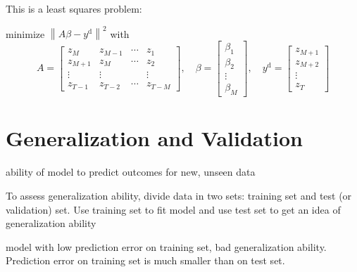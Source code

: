 \begin{problem}
    This is a least squares problem: 
    
    minimize $ \left\|A \beta-y^{\mathrm{d}}\right\|^{2} $ with
\begin{equation}
A=\left[\begin{array}{cccc}
z_{M} & z_{M-1} & \cdots & z_{1} \\
z_{M+1} & z_{M} & \cdots & z_{2} \\
\vdots & \vdots & & \vdots \\
z_{T-1} & z_{T-2} & \cdots & z_{T-M}
\end{array}\right], \quad \beta=\left[\begin{array}{c}
\beta_{1} \\
\beta_{2} \\
\vdots \\
\beta_{M}
\end{array}\right], \quad y^{\mathrm{d}}=\left[\begin{array}{c}
z_{M+1} \\
z_{M+2} \\
\vdots \\
z_{T}
\end{array}\right]
\end{equation}

\end{problem}



\section{Generalization and Validation}

\begin{definition}
    ability of model to predict outcomes for new, unseen data
\end{definition}

\begin{definition}
    To assess generalization ability, divide data in two sets: training set and test (or validation) set. Use training set to fit model and use test set to get an idea of generalization ability
\end{definition}

\begin{definition}
    model with low prediction error on training set, bad generalization ability. Prediction error on training set is much smaller than on test set.
\end{definition}


